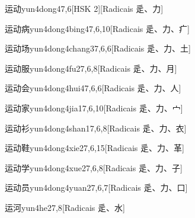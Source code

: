 \begin{entry}{运动}{yun4dong4}{7,6}[HSK 2][Radicais ⾡、⼒]
\end{entry}

\begin{entry}{运动病}{yun4dong4bing4}{7,6,10}[Radicais ⾡、⼒、⽧]
\end{entry}

\begin{entry}{运动场}{yun4dong4chang3}{7,6,6}[Radicais ⾡、⼒、⼟]
\end{entry}

\begin{entry}{运动服}{yun4dong4fu2}{7,6,8}[Radicais ⾡、⼒、⽉]
\end{entry}

\begin{entry}{运动会}{yun4dong4hui4}{7,6,6}[Radicais ⾡、⼒、⼈]
\end{entry}

\begin{entry}{运动家}{yun4dong4jia1}{7,6,10}[Radicais ⾡、⼒、⼧]
\end{entry}

\begin{entry}{运动衫}{yun4dong4shan1}{7,6,8}[Radicais ⾡、⼒、⾐]
\end{entry}

\begin{entry}{运动鞋}{yun4dong4xie2}{7,6,15}[Radicais ⾡、⼒、⾰]
\end{entry}

\begin{entry}{运动学}{yun4dong4xue2}{7,6,8}[Radicais ⾡、⼒、⼦]
\end{entry}

\begin{entry}{运动员}{yun4dong4yuan2}{7,6,7}[Radicais ⾡、⼒、⼝]
\end{entry}

\begin{entry}{运河}{yun4he2}{7,8}[Radicais ⾡、⽔]
\end{entry}

